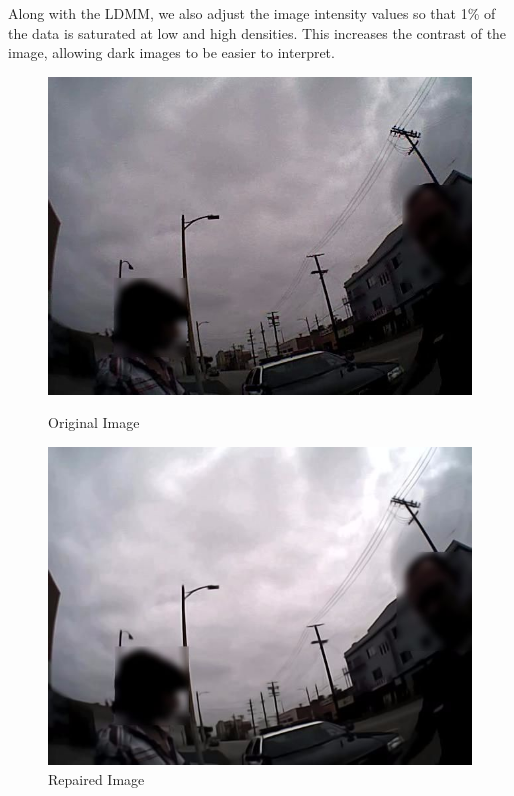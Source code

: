 \documentclass[a4paper]{article}
\begin{document}
Along with the LDMM, we also adjust the image intensity values so that 1\% of the data is saturated at low and high densities. This increases the contrast of the image, allowing dark images to be easier to interpret.

\begin{figure}[H]
\begin{minipage}[b]{0.48\textwidth}
 \includegraphics[width=\textwidth]{contrastee_censored.jpg}
 \caption{Original Image}
 \end{minipage}
  \hfill
  \begin{minipage}[b]{0.48\textwidth}
    \includegraphics[width=\textwidth]{contrasted_censored.jpg}
    \caption{Repaired Image}
  \end{minipage}
\end{figure}
\end{document}
